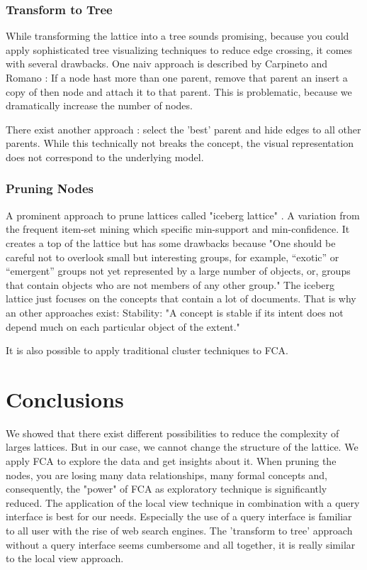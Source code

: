 \documentclass[11pt]{report}
\begin{document}
\subsubsection{Transform to Tree}

While transforming the lattice into a tree sounds promising, because you could apply sophisticated tree visualizing techniques to reduce edge crossing, it comes with several drawbacks. One naiv approach is described by Carpineto and Romano \cite{carpineto2004concept}: If a node hast more than one parent, remove that parent an insert a copy of then node and attach it to that parent. This is problematic, because we dramatically increase the number of nodes. 

There exist another approach \cite{Melo2011}: select the 'best' parent and hide edges to all other parents. While this technically not breaks the concept, the visual representation does not correspond to the underlying model.

\subsubsection{Pruning Nodes}

A prominent approach to prune lattices called "iceberg lattice" \cite{Stumme2002}. A variation from the frequent item-set mining which specific min-support and min-confidence\cite{Agrawal1993}. It creates a top of the lattice but has some drawbacks because "One should be careful not to overlook small but interesting groups, for example, “exotic” or “emergent” groups not yet represented by a large number of objects, or, groups that contain objects who are not members of any other group."\cite{Kuznetsov20072} The iceberg lattice just focuses on the concepts that contain a lot of documents. That is why an other approaches exist: Stability\cite{Kuznetsov2007}: "A concept is stable if its intent does not depend much on each particular object of the extent." \cite{Kuznetsov20072}

	It is also possible to apply traditional cluster techniques to FCA.\cite{AswaniKumar2010}


\section{Conclusions}

We showed that there exist different possibilities to reduce the complexity of larges lattices. But in our case, we cannot change the structure of the lattice. We apply FCA to explore the data and get insights about it. When pruning the nodes, you are losing many data relationships, many formal concepts and, consequently, the "power" of FCA as exploratory technique is significantly reduced.
The application of the local view technique in combination with a query interface is best for our needs. Especially the use of a query interface is familiar to all user with the rise of web search engines. The 'transform to tree' approach without a query interface seems cumbersome and all together, it is really similar to the local view approach.
\end{document}
